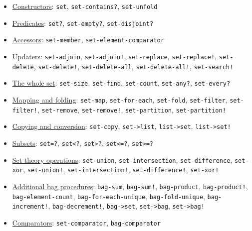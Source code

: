 \begin{itemize}
\item
  \protect\hyperlink{Constructors}{Constructors}: \texttt{set},
  \texttt{set-contains?}, \texttt{set-unfold}
\item
  \protect\hyperlink{Predicates}{Predicates}: \texttt{set?},
  \texttt{set-empty?}, \texttt{set-disjoint?}
\item
  \protect\hyperlink{Accessors}{Accessors}: \texttt{set-member},
  \texttt{set-element-comparator}
\item
  \protect\hyperlink{Updaters}{Updaters}: \texttt{set-adjoin},
  \texttt{set-adjoin!}, \texttt{set-replace}, \texttt{set-replace!},
  \texttt{set-delete}, \texttt{set-delete!}, \texttt{set-delete-all},
  \texttt{set-delete-all!}, \texttt{set-search!}
\item
  \protect\hyperlink{Thewholeset}{The whole set}: \texttt{set-size},
  \texttt{set-find}, \texttt{set-count}, \texttt{set-any?},
  \texttt{set-every?}
\item
  \protect\hyperlink{Mappingandfolding}{Mapping and folding}:
  \texttt{set-map}, \texttt{set-for-each}, \texttt{set-fold},
  \texttt{set-filter}, \texttt{set-filter!}, \texttt{set-remove},
  \texttt{set-remove!}, \texttt{set-partition}, \texttt{set-partition!}
\item
  \protect\hyperlink{Copyingandconversion}{Copying and conversion}:
  \texttt{set-copy}, \texttt{set-\textgreater{}list},
  \texttt{list-\textgreater{}set}, \texttt{list-\textgreater{}set!}
\item
  \protect\hyperlink{Subsets}{Subsets}: \texttt{set=?},
  \texttt{set\textless{}?}, \texttt{set\textgreater{}?},
  \texttt{set\textless{}=?}, \texttt{set\textgreater{}=?}
\item
  \protect\hyperlink{Settheoryoperations}{Set theory operations}:
  \texttt{set-union}, \texttt{set-intersection},
  \texttt{set-difference}, \texttt{set-xor}, \texttt{set-union!},
  \texttt{set-intersection!}, \texttt{set-difference!},
  \texttt{set-xor!}
\item
  \protect\hyperlink{Additionalbagprocedures}{Additional bag
  procedures}: \texttt{bag-sum}, \texttt{bag-sum!},
  \texttt{bag-product}, \texttt{bag-product!},
  \texttt{bag-element-count}, \texttt{bag-for-each-unique},
  \texttt{bag-fold-unique}, \texttt{bag-increment!},
  \texttt{bag-decrement!}, \texttt{bag-\textgreater{}set},
  \texttt{set-\textgreater{}bag}, \texttt{set-\textgreater{}bag!}
\item
  \protect\hyperlink{Comparators}{Comparators}: \texttt{set-comparator},
  \texttt{bag-comparator}
\end{itemize}

